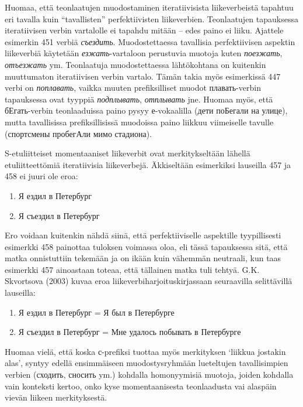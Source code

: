 \documentclass[]{scrreprt}
\providecommand{\tightlist}{%
  \setlength{\itemsep}{0pt}\setlength{\parskip}{0pt}}
\begin{document}
Huomaa, että teonlaatujen muodostaminen iteratiivisista liikeverbeistä
tapahtuu eri tavalla kuin ``tavallisten'' perfektiivisten liikeverbien.
Teonlaatujen tapauksessa iteratiivisen verbin vartalolle ei tapahdu
mitään -- edes paino ei liiku. Ajattele esimerkin 451 verbiä
\emph{съездить}. Muodostettaessa tavallisia perfektiivisen aspektin
liikeverbiä käytetään \emph{езжать}-vartaloon perustuvia muotoja kuten
\emph{поезжать}, \emph{отъезжать} ym. Teonlaatuja muodostettaessa
lähtökohtana on kuitenkin muuttumaton iteratiivisen verbin vartalo.
Tämän takia myös esimerkissä 447 verbi on \emph{поплавать}, vaikka
muuten prefiksilliset muodot плавать-verbin tapauksessa ovat tyyppiä
\emph{подплывать}, \emph{отплывать} jne. Huomaa myös, että бЕгать-verbin
teonlaaduissa paino pysyy е-vokaalilla (дети поБегали на улице), mutta
tavallisissa prefiksillisissä muodoissa paino liikkuu viimeiselle
tavulle (спортсмены пробегАли мимо стадиона).

S-etuliitteiset momentaaniset liikeverbit ovat merkitykseltään lähellä
etuliitteettömiä iteratiivisia liikeverbejä. Äkkiseltään esimerkiksi
lauseilla 457 ja 458 ei juuri ole eroa:

\begin{enumerate}
\def\labelenumi{(\arabic{enumi})}
\setcounter{enumi}{456}
\tightlist
\item
  Я ездил в Петербург
\item
  Я съездил в Петербург
\end{enumerate}

Ero voidaan kuitenkin nähdä siinä, että perfektiiviselle aspektille
tyypillisesti esimerkki 458 painottaa tuloksen voimassa oloa, eli tässä
tapauksessa sitä, että matka onnistuttiin tekemään ja on ikään kuin
vähemmän neutraali, kun taas esimerkki 457 ainoastaan toteaa, että
tällainen matka tuli tehtyä. G.K. Skvortsova (2003) kuvaa eroa
liikeverbiharjoituskirjassaan seuraavilla selittävillä lauseilla:

\begin{enumerate}
\def\labelenumi{(\arabic{enumi})}
\setcounter{enumi}{458}
\tightlist
\item
  Я ездил в Петербург = Я был в Петербурге
\item
  Я съездил в Петербург = Мне удалось побывать в Петербурге
\end{enumerate}

Huomaa vielä, että koska с-prefiksi tuottaa myös merkityksen `liikkua
jostakin alas', syntyy edellä ensimmäiseen muodostysryhmään lueteltujen
tavallisimpien verbien (сходить, сносить ym.) kohdalla homonyymisiä
muotoja, joiden kohdalla vain konteksti kertoo, onko kyse
momentaanisesta teonlaadusta vai alaspäin vievän liikeen merkityksestä.
\end{document}
